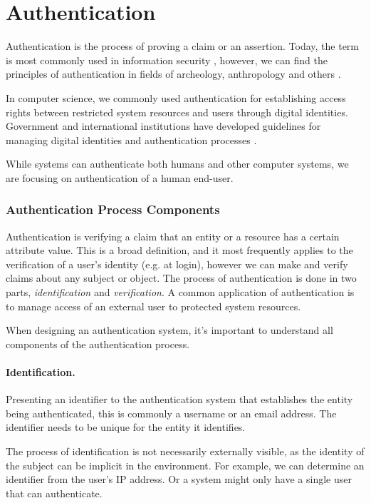 \section{Authentication}

Authentication is the process of proving a claim or an assertion.
Today, the term is most commonly used in information security \cite{shirey2007internet}, however, we can find the principles of authentication in fields of archeology, anthropology and others \cite{Odegaard2014}.

In computer science, we commonly used authentication for establishing access rights between restricted system resources and users through digital identities.
Government and international institutions have developed guidelines for managing digital identities and authentication processes \cite{grassi2017}.

While systems can authenticate both humans and other computer systems, we are focusing on authentication of a human end-user.

\subsubsection{Authentication Process Components}
Authentication \cite{shirey2007internet} is verifying a claim that an entity or a resource has a certain attribute value.
This is a broad definition, and it most frequently applies to the verification of a user's identity (e.g. at login), however we can make and verify claims about any subject or object.
The process of authentication is done in two parts, \textit{identification} and \textit{verification}.
A common application of authentication is to manage access of an external user to protected system resources.

When designing an authentication system, it's important to understand all components of the authentication process.

\paragraph{Identification.} Presenting an identifier to the authentication system that establishes the entity being authenticated, this is commonly a username or an email address.
The identifier needs to be unique for the entity it identifies.

The process of identification is not necessarily externally visible, as the identity of the subject can be implicit in the environment. 
For example, we can determine an identifier from the user’s IP address.
Or a system might only have a single user that can authenticate.



